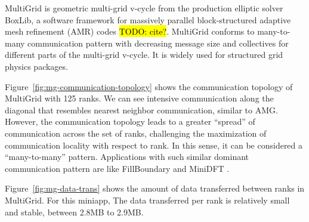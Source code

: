 \documentclass[conference]{IEEEtran}
\newcommand{\TODO}[1]{\hl{TODO: #1}}
\begin{document}
MultiGrid is geometric multi-grid v-cycle from the production elliptic solver BoxLib, a software framework for massively parallel block-structured adaptive mesh refinement (AMR) codes \TODO{cite?}. MultiGrid conforms to many-to-many communication pattern with decreasing message size and collectives for different parts of the multi-grid v-cycle. It is widely used for structured grid physics packages. 

Figure~\ref{fig:mg-communication-topology} shows the communication topology of MultiGrid with 125 ranks. We can see intensive communication along the diagonal that resembles nearest neighbor communication, similar to AMG. However, the communication topology leads to a greater ``spread'' of communication across the set of ranks, challenging the maximization of communication locality with respect to rank. In this sense, it can be considered a ``many-to-many'' pattern. Applications with such similar dominant communication pattern are like FillBoundary and MiniDFT \cite{designforwardwebpage}.

Figure~\ref{fig:mg-data-trans} shows the amount of data transferred between ranks in MultiGrid. For this miniapp, The data transferred per rank is relatively small and stable, between 2.8MB to 2.9MB.
\end{document}
